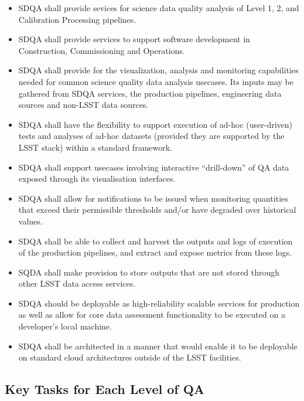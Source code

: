 \begin{itemize}
\item SDQA shall provide sevices for science data quality analysis of Level 1, 2, and Calibration Processing pipelines.

\item SDQA shall provide services to support software development in Construction, Commissioning and Operations.

\item SDQA shall provide for the visualization, analysis and monitoring capabilities needed for common science quality data analysis usecases. Its inputs may be gathered from SDQA services, the production pipelines, engineering data sources and non-LSST data sources. 

\item SDQA shall have the flexibility to support execution of ad-hoc (user-driven) tests and analyses of ad-hoc datasets (provided they are supported by the LSST stack) within a standard framework.  

\item SDQA shall support usecases involving interactive ``drill-down'' of QA data exposed through its visualisation interfaces. 

\item SDQA shall allow for notifications to be issued when monitoring quantities that exceed their permissible thresholds and/or have degraded over historical values. 

\item SDQA shall be able to collect and harvest the outputs and logs of execution of the production pipelines, and extract and expose metrics from these logs. 

\item SQDA shall make provision to store outputs that are not stored through other LSST data access services. 

\item SDQA should be deployable as high-reliability scalable services for production as well as allow for core data assessment functionality to be executed on a developer's local machine.

\item SDQA shall be architected in a manner that would enable it to be deployable on standard cloud architectures outside of the LSST facilities. 


\end{itemize}


\subsection{Key Tasks for Each Level of QA}

